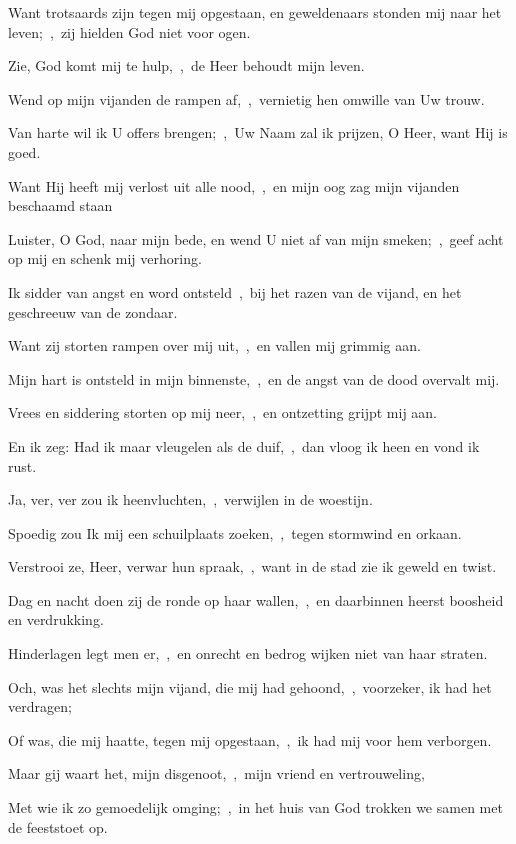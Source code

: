 \documentclass[12pt,twoside,a5paper]{article}
\begin{document}
\begin{halfparskip}
  Want trotsaards zijn tegen mij opgestaan, en geweldenaars stonden mij naar het leven;~\sep\ zij hielden God niet voor ogen.

  Zie, God komt mij te hulp,~\sep\ de Heer behoudt mijn leven.

  Wend op mijn vijanden de rampen af,~\sep\ vernietig hen omwille van Uw trouw.

  Van harte wil ik U offers brengen;~\sep\ Uw Naam zal ik prijzen, O Heer, want Hij is goed.

  Want Hij heeft mij verlost uit alle nood,~\sep\ en mijn oog zag mijn vijanden beschaamd staan

   Luister, O God, naar mijn bede, en wend U niet af van mijn smeken;~\sep\ geef acht op mij en schenk mij verhoring.

  Ik sidder van angst en word ontsteld~\sep\ bij het razen van de vijand, en het geschreeuw van de zondaar.

  Want zij storten rampen over mij uit,~\sep\ en vallen mij grimmig aan.

  Mijn hart is ontsteld in mijn binnenste,~\sep\ en de angst van de dood overvalt mij.

  Vrees en siddering storten op mij neer,~\sep\ en ontzetting grijpt mij aan.

  En ik zeg: Had ik maar vleugelen als de duif,~\sep\ dan vloog ik heen en vond ik rust.

  Ja, ver, ver zou ik heenvluchten,~\sep\ verwijlen in de woestijn.

  Spoedig zou Ik mij een schuilplaats zoeken,~\sep\ tegen stormwind en orkaan.

  Verstrooi ze, Heer, verwar hun spraak,~\sep\ want in de stad zie ik geweld en twist.

  Dag en nacht doen zij de ronde op haar wallen,~\sep\ en daarbinnen heerst boosheid en verdrukking.

  Hinderlagen legt men er,~\sep\ en onrecht en bedrog wijken niet van haar straten.

  Och, was het slechts mijn vijand, die mij had gehoond,~\sep\ voorzeker, ik had het verdragen;

  Of was, die mij haatte, tegen mij opgestaan,~\sep\ ik had mij voor hem verborgen.

  Maar gij waart het, mijn disgenoot,~\sep\ mijn vriend en vertrouweling,

  Met wie ik zo gemoedelijk omging;~\sep\ in het huis van God trokken we samen met de feeststoet op.


\end{halfparskip}
\end{document}
